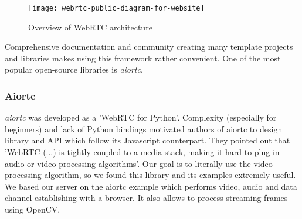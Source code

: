 \documentclass[../Main.tex]{subfiles}
\begin{document}
    \begin{figure}[h]
    \centering
    \texttt{[image: webrtc-public-diagram-for-website]}
    \caption{Overview of WebRTC architecture}
    \end{figure}

    Comprehensive documentation and community creating many template projects and libraries makes using this framework rather convenient. One of the most popular open-source libraries is \textit{aiortc}.
    
    \subsubsection{Aiortc}
    \textit{aiortc} was developed as a 'WebRTC for Python'. Complexity (especially for beginners) and lack of Python bindings motivated authors of aiortc to design library and API which follow its Javascript counterpart. They pointed out that  'WebRTC (...) is tightly coupled to a media stack, making it hard to plug in audio or video processing algorithms'. Our goal is to literally use the video processing algorithm, so we found this library and its examples extremely useful.
    We based our server on the aiortc example which performs video, audio and data channel establishing with a browser. It also allows to process streaming frames using OpenCV. 
    
\end{document}
